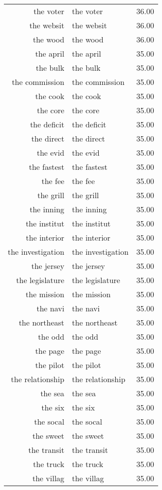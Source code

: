\begin{table}[ht]
\begin{tabular}{rlr}
  the voter & the voter & 36.00 \\ 
  the websit & the websit & 36.00 \\ 
  the wood & the wood & 36.00 \\ 
  the april & the april & 35.00 \\ 
  the bulk & the bulk & 35.00 \\ 
  the commission & the commission & 35.00 \\ 
  the cook & the cook & 35.00 \\ 
  the core & the core & 35.00 \\ 
  the deficit & the deficit & 35.00 \\ 
  the direct & the direct & 35.00 \\ 
  the evid & the evid & 35.00 \\ 
  the fastest & the fastest & 35.00 \\ 
  the fee & the fee & 35.00 \\ 
  the grill & the grill & 35.00 \\ 
  the inning & the inning & 35.00 \\ 
  the institut & the institut & 35.00 \\ 
  the interior & the interior & 35.00 \\ 
  the investigation & the investigation & 35.00 \\ 
  the jersey & the jersey & 35.00 \\ 
  the legislature & the legislature & 35.00 \\ 
  the mission & the mission & 35.00 \\ 
  the navi & the navi & 35.00 \\ 
  the northeast & the northeast & 35.00 \\ 
  the odd & the odd & 35.00 \\ 
  the page & the page & 35.00 \\ 
  the pilot & the pilot & 35.00 \\ 
  the relationship & the relationship & 35.00 \\ 
  the sea & the sea & 35.00 \\ 
  the six & the six & 35.00 \\ 
  the socal & the socal & 35.00 \\ 
  the sweet & the sweet & 35.00 \\ 
  the transit & the transit & 35.00 \\ 
  the truck & the truck & 35.00 \\ 
  the villag & the villag & 35.00 \\ 

\end{tabular}
\end{table}
